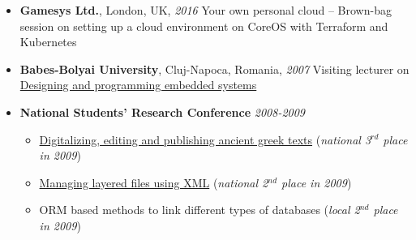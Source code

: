 \documentclass[10pt,a4paper,roman]{moderncv}
\begin{document}
{\begin{itemize}
\href{https://www.youtube.com/watch?v=wuBHNp87Sgk}{Containers} -- Talk about issues when introducing docker as a deployment tool
\item \textbf{Gamesys Ltd.}, London, UK, \emph{2016} \newline
Your own personal cloud -- Brown-bag session on setting up a cloud environment on CoreOS with Terraform and Kubernetes
\item \textbf{Babes-Bolyai University}, Cluj-Napoca, Romania, \emph{2007} \newline
Visiting lecturer on \href{http://www.cs.ubbcluj.ro/~bittologatok/plakat2007_dec5-6.pdf}{Designing and programming embedded systems}
\item \textbf{National Students' Research Conference} \emph{2008-2009}
 \begin{itemize}
 \item \href{http://www.inf.unideb.hu/otdk2009/harmadikhely.html}{Digitalizing, editing and publishing ancient greek texts} (\emph{national 3$^{rd}$ place in 2009})
 \item \href{http://www.inf.unideb.hu/otdk2009/masodikhely.html}{Managing layered files using XML} (\emph{national 2$^{nd}$ place in 2009})
 \item ORM based methods to link different types of databases (\emph{local 2$^{nd}$ place in 2009})
 \end{itemize}
\end{itemize}
}
\end{document}
